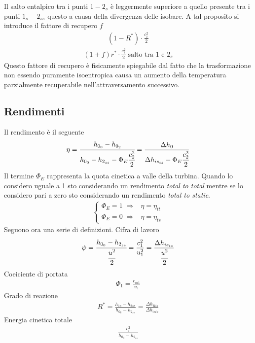 Il salto entalpico tra i punti $1 - 2_s$ è leggermente superiore a quello presente tra i punti $1_s - 2_{ss}$ questo a causa della divergenza delle isobare. A tal proposito si introduce il fattore di recupero $f$ 
\begin{align*}
(1- R^*) \cdot \frac{c_i^2}{2}
\end{align*}
\begin{align*}
(1+f)r^* \cdot \frac{c_i^2}{2} \; \mbox{salto tra $1$ e $2_s$}
\end{align*}
Questo fattore di recupero è fisicamente spiegabile dal fatto che la trasformazione non essendo puramente isoentropica causa un aumento della temperatura parzialmente recuperabile nell'attraversamento successivo. 

\subsection{Rendimenti}
Il rendimento è il seguente
\begin{align*}
\eta = \cfrac{h_{0_0} - h_{0_2}}{h_{0_0} - h_{2_{ss}} - \Phi_E \cfrac{c_2^2}{2}} = \frac{\Delta h_0}{\Delta h_{is_{ts}}-\Phi_E \cfrac{c_2^2}{2}}
\end{align*}
Il termine $\Phi_E$ rappresenta la quota cinetica a valle della turbina. Quando lo considero uguale a 1 sto considerando un rendimento \textit{total to total} mentre se lo considero pari a zero sto considerando un rendimento \textit{total to static}.
\begin{align*}
\begin{cases}
\Phi_E = 1 \; \Rightarrow & \eta = \eta_{tt}\\
\Phi_E = 0 \; \Rightarrow & \eta = \eta_{ts}
\end{cases} 
\end{align*}
Seguono ora una serie di definizioni. Cifra di lavoro
\begin{align*}
\psi = \cfrac{h_{0_0} - h_{2_{ss}}}{\cfrac{u^2}{2}} = \frac{c_1^2}{u_1^2} = \frac{\Delta h_{is_{ts}}}{\cfrac{u^2}{2}}
\end{align*}
Coeiciente di portata
\begin{align*}
\Phi_1 = \frac{c_{m1}}{u_1}
\end{align*}
Grado di reazione
\begin{align*}
R^* = \frac{h_{1s} - h_{2ss}}{h_{0_0} - h_{2_{ss}}} = \frac{\Delta h_{Ris}}{\Delta h_{ists}}
\end{align*}
Energia cinetica totale
\begin{align*}
\frac{c_i^2}{h_{0_0} - h_{2_{ss}}}
\end{align*}
